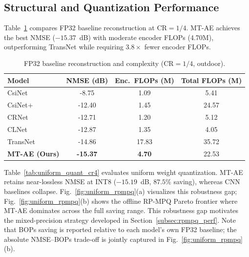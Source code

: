 \documentclass[conference]{IEEEtran}
\begin{document}
\subsection{Structural and Quantization Performance}
\label{subsec:struct_quant}

Table~\ref{tab:struct_cr14_final} compares FP32 baseline reconstruction at $\mathrm{CR}=1/4$.
MT-AE achieves the best NMSE ($-15.37$~dB) with moderate encoder FLOPs (4.70M), outperforming TransNet while requiring $3.8\times$ fewer encoder FLOPs.

\begin{table}[t]
\centering
\caption{FP32 baseline reconstruction and complexity ($\mathrm{CR}=1/4$, outdoor).}
\label{tab:struct_cr14_final}
\setlength{\tabcolsep}{4pt}
\begin{tabular}{lccc}
\toprule
Model & NMSE (dB) & Enc.\ FLOPs (M) & Total FLOPs (M) \\
\midrule
CsiNet   & -8.75  &  1.09 &   5.41 \\
CsiNet+  & -12.40 &  1.45 &  24.57 \\
CRNet    & -12.71 &  1.20 &   5.12 \\
CLNet    & -12.87 &  1.35 &   4.05 \\
TransNet & -14.86 & 17.83 &  35.72 \\
\textbf{MT-AE (Ours)} & \textbf{-15.37} & \textbf{4.70} & 22.53 \\
\bottomrule
\end{tabular}
\end{table}

Table~\ref{tab:uniform_quant_cr4} evaluates uniform weight quantization.
MT-AE retains near-lossless NMSE at INT8 ($-15.19$~dB, $87.5\%$ saving), whereas CNN baselines collapse.
Fig.~\ref{fig:uniform_rpmpq}(a) visualizes this robustness gap; Fig.~\ref{fig:uniform_rpmpq}(b) shows the offline RP-MPQ Pareto frontier where MT-AE dominates across the full saving range.
This robustness gap motivates the mixed-precision strategy developed in Section~\ref{subsec:rpmpq_perf}.
Note that BOPs saving is reported relative to each model's own FP32 baseline; the absolute NMSE--BOPs trade-off is jointly captured in Fig.~\ref{fig:uniform_rpmpq}(b).
\end{document}
